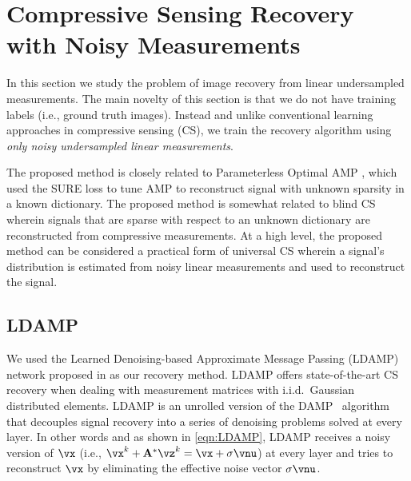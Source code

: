\documentclass{article}
\begin{document}
\section{Compressive Sensing Recovery with Noisy Measurements}\label{sec:CS}
In this section we study the problem of image recovery from linear undersampled measurements. The main novelty of this section is that we do not have training labels (i.e., ground truth images). Instead and unlike conventional learning approaches in compressive sensing (CS), we train the recovery algorithm using \emph{only noisy undersampled linear measurements}.

The proposed method is closely related to Parameterless Optimal AMP \cite{ParameterlessAMP}, which used the SURE loss to tune AMP \cite{AMP} to reconstruct signal with unknown sparsity in a known dictionary. 
The proposed method is somewhat related to blind CS \cite{BlindCS} wherein signals that are sparse with respect to an unknown dictionary are reconstructed from compressive measurements. 
At a high level, the proposed method can be considered a practical form of universal CS \cite{jalali2014minimum,BaronUniversalCS1, BaronUniversalCS2,jalali2017universal} wherein a signal's distribution is estimated from noisy linear measurements and used to reconstruct the signal. 

\subsection{LDAMP}

We used the Learned Denoising-based Approximate Message Passing (LDAMP) network proposed in \cite{LDAMP} as our recovery method. LDAMP offers state-of-the-art CS recovery when dealing with measurement matrices with i.i.d.~Gaussian distributed elements. LDAMP is an unrolled version of the DAMP~\cite{DAMP} algorithm that decouples signal recovery into a series of denoising problems solved at every layer. In other words and as shown in \eqref{eqn:LDAMP}, LDAMP receives a noisy version of $\vx$ (i.e., $\vx^k+\mathbf{A}^*\vz^k=\vx+\sigma \vnu$) at every layer and tries to reconstruct $\vx$ by eliminating the effective noise vector $\sigma \vnu$. 
\end{document}
